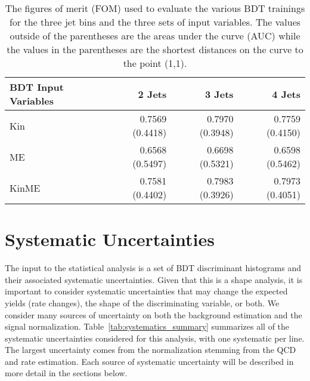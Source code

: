 \begin{table}[htbp]
\centering
\begin{tabular}{lrrr} \hline
BDT Input Variables & 2 Jets & 3 Jets & 4 Jets                         \\\hline
Kin                 & 0.7569 (0.4418) & 0.7970 (0.3948) & 0.7759 (0.4150) \\
ME                  & 0.6568 (0.5497) & 0.6698 (0.5321) & 0.6598 (0.5462) \\
KinME               & 0.7581 (0.4402) & 0.7983 (0.3926) & 0.7973 (0.4051) \\\hline
\end{tabular}
\caption{The  figures of merit (FOM) used to evaluate the various BDT trainings for the three jet bins and the three sets of input variables. The values outside of the parentheses are the areas under the curve (AUC) while the values in the parentheses are the shortest distances on the curve to the point (1,1).}
\label{tab:BDT_FOM_comparison}
\end{table}

\section{Systematic Uncertainties}

The input to the statistical analysis is a set of BDT discriminant histograms and their associated systematic uncertainties.
Given that this is a shape analysis, it is important to consider systematic uncertainties that may change the expected yields (rate changes), the shape of the discriminating variable, or both.
We consider many sources of uncertainty on both the background estimation and the signal normalization.
Table~\ref{tab:systematics_summary} summarizes all of the systematic uncertainties considered for this analysis, with one systematic per line.
The largest uncertainty comes from the \Wjets normalization stemming from the QCD and \Wjets rate estimation.
Each source of systematic uncertainty will be described in more detail in the sections below.

